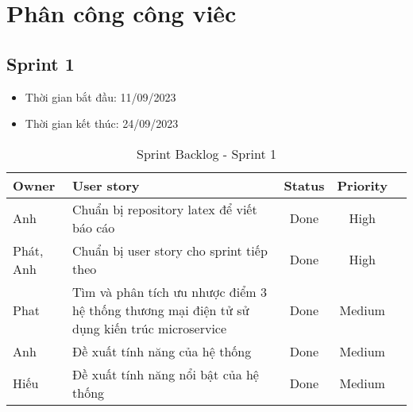 \chapter{Phân công công viêc}
\section{Sprint 1}
\begin{itemize}
    \item Thời gian bắt đầu: 11/09/2023
    \item Thời gian kết thúc: 24/09/2023
\end{itemize}
\begin{table}[H]
    \begin{tabular}{|m{2.5cm}|m{9cm}|c|c|c|}
    \hline
    \textbf{Owner}  & \textbf{User story}                                & \textbf{Status}  & \textbf{Priority} \\ \hline
    Anh                  & Chuẩn bị repository latex để viết báo cáo                                     & Done                              & High              \\ \hline
    Phát, Anh            & Chuẩn bị user story cho sprint tiếp theo                                             & Done                              & High              \\ \hline
    Phat                 & Tìm và phân tích ưu nhược điểm 3 hệ thống thương mại điện tử sử dụng kiến trúc microservice  & Done                              & Medium            \\ \hline
    Anh                  & Đề xuất tính năng của hệ thống                               & Done                              & Medium            \\ \hline
    Hiếu                 & Đề xuất tính năng nổi bật của hệ thống                         & Done                              & Medium            \\ \hline
    \end{tabular}
    \caption{Sprint Backlog - Sprint 1}
    \label{tab:sprint-1}
\end{table}
